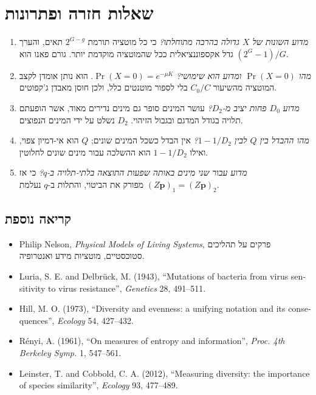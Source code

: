 \section*{שאלות חזרה ופתרונות}
\begin{enumerate}
\item \emph{מדוע השונות של \(X\) גדולה בהרבה מתוחלתו?} כי כל מוטציה תורמת \(2^{G-g}\) תאים, והערך גדל אקספוננציאלית ככל שהמוטציה מוקדמת יותר. גורם פאנו הוא \((2^G-1)/G\).
\item \emph{מהו \(\Pr(X=0)\) ומדוע הוא שימושי?} \(\Pr(X=0)=e^{-\mu K}\). הוא נותן אומדן לקצב המוטציה מהשיעור \(C_0/C\) בלי לספור מוטנטים כלל, ולכן חוסן מאבדן ג'קפוטים.
\item \emph{מדוע \(D_0\) פחות יציב מ-\(D_2\)?} עושר המינים סופר גם מינים נדירים מאוד, אשר הופעתם תלויה בגודל המדגם ובגבול הזיהוי. \(D_2\) נשלט על ידי המינים הנפוצים.
\item \emph{מהו ההבדל בין \(Q\) לבין \(1-1/D_2\)?} אין הבדל כשכל המינים שונים; \(Q\) הוא אי-דמיון צפוי, ואילו \(1-1/D_2\) הוא ההשלכה עבור מינים שונים לחלוטין.
\item \emph{מדוע עבור שני מינים באותה שפעות התוצאה בלתי-תלויה ב-\(q\)?} כי אז \((Z\mathbf p)_1=(Z\mathbf p)_2\) מפורק את הביטוי, והתלות ב-\(q\) נעלמת.
\end{enumerate}

\subsection*{קריאה נוספת}
\begin{itemize}
\item \textenglish{Philip Nelson}, \emph{\textenglish{Physical Models of Living Systems}}, פרקים על תהליכים סטוכסטיים, מוטציות מידע ואנטרופיה.
\item \textenglish{Luria, S. E. and Delbrück, M. (1943), ``Mutations of bacteria from virus sensitivity to virus resistance'', \emph{Genetics} 28, 491--511.}
\item \textenglish{Hill, M. O. (1973), ``Diversity and evenness: a unifying notation and its consequences'', \emph{Ecology} 54, 427--432.}
\item \textenglish{Rényi, A. (1961), ``On measures of entropy and information'', \emph{Proc. 4th Berkeley Symp.} 1, 547--561.}
\item \textenglish{Leinster, T. and Cobbold, C. A. (2012), ``Measuring diversity: the importance of species similarity'', \emph{Ecology} 93, 477--489.}
\end{itemize}
